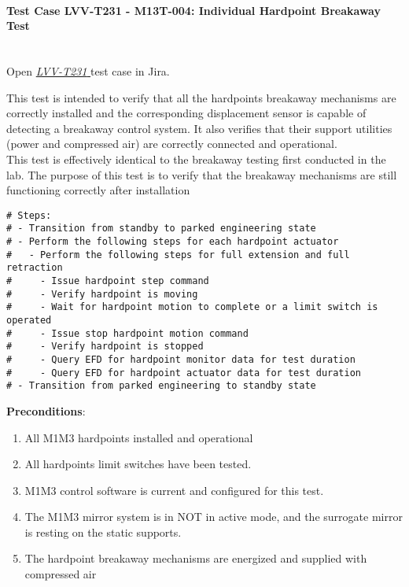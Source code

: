 \documentclass[SE,lsstdraft,STR,toc]{lsstdoc}
\providecommand{\tightlist}{
  \setlength{\itemsep}{0pt}\setlength{\parskip}{0pt}}
\begin{document}
\paragraph{Test Case LVV-T231 - M13T-004: Individual Hardpoint Breakaway Test }\mbox{}\\

Open  \href{https://jira.lsstcorp.org/secure/Tests.jspa#/testCase/LVV-T231}{\textit{ LVV-T231 } }
test case in Jira.

This test is intended to verify that all the hardpoints breakaway
mechanisms are correctly installed and the corresponding displacement
sensor is capable of detecting a breakaway control system. It also
verifies that their support utilities (power and compressed air) are
correctly connected and operational.\\
This test is effectively identical to the breakaway testing first
conducted in the lab. The purpose of this test is to verify that the
breakaway mechanisms are still functioning correctly after
installation\\[2\baselineskip]

\begin{verbatim}
# Steps:
# - Transition from standby to parked engineering state
# - Perform the following steps for each hardpoint actuator
#   - Perform the following steps for full extension and full retraction
#     - Issue hardpoint step command
#     - Verify hardpoint is moving
#     - Wait for hardpoint motion to complete or a limit switch is operated
#     - Issue stop hardpoint motion command
#     - Verify hardpoint is stopped
#     - Query EFD for hardpoint monitor data for test duration
#     - Query EFD for hardpoint actuator data for test duration
# - Transition from parked engineering to standby state
\end{verbatim}

\textbf{ Preconditions}:\\
\begin{enumerate}
\tightlist
\item
  All M1M3 hardpoints installed and operational
\item
  All hardpoints limit switches have been tested.
\item
  M1M3 control software is current and configured for this test.
\item
  The M1M3 mirror system is in NOT in active mode, and the surrogate
  mirror is resting on the static supports.
\item
  The hardpoint breakaway mechanisms are energized and supplied with
  compressed air
\end{enumerate}
\end{document}
